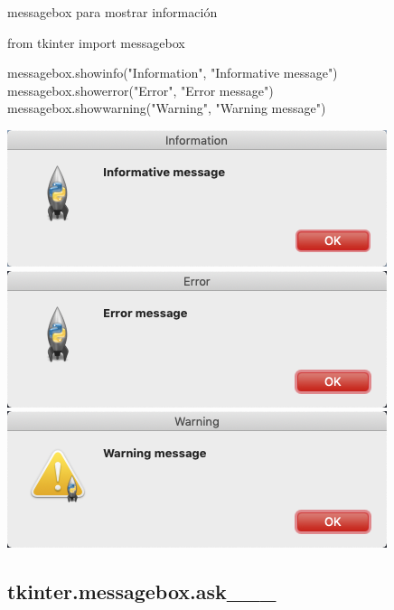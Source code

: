 \documentclass[10pt, envcountsect , spanish]{beamer}
\begin{document}
\begin{frame}[fragile]{messagebox para mostrar información} 

\begin{pyverbatim}[][frame=single]
from tkinter import messagebox

messagebox.showinfo("Information", "Informative message")
messagebox.showerror("Error", "Error message")
messagebox.showwarning("Warning", "Warning message")
\end{pyverbatim}

\centerline{\includegraphics[width=.3\textwidth]{fig/showinfo} \hfill
\includegraphics[width=.3\textwidth]{fig/showerror} \hfill
\includegraphics[width=.3\textwidth]{fig/showwarning}
}

\end{frame}




\subsection{tkinter.messagebox.ask\_\_\_}
\end{document}
